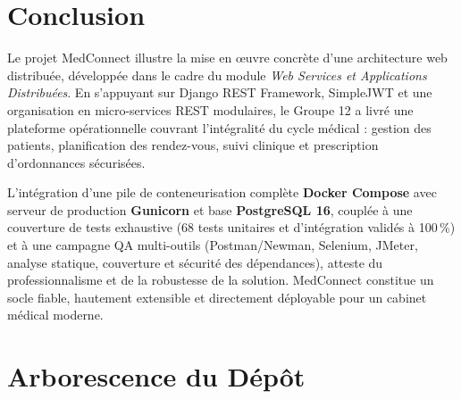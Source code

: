 \documentclass[12pt,a4paper]{report}
\begin{document}
\chapter*{Conclusion}

Le projet MedConnect illustre la mise en \oe{}uvre concrète d'une architecture web distribuée, développée dans le cadre du module \textit{Web Services et Applications Distribuées}. En s'appuyant sur Django REST Framework, SimpleJWT et une organisation en micro-services REST modulaires, le Groupe 12 a livré une plateforme opérationnelle couvrant l'intégralité du cycle médical : gestion des patients, planification des rendez-vous, suivi clinique et prescription d'ordonnances sécurisées.

L'intégration d'une pile de conteneurisation complète \textbf{Docker Compose} avec serveur de production \textbf{Gunicorn} et base \textbf{PostgreSQL 16}, couplée à une couverture de tests exhaustive (68 tests unitaires et d'intégration validés à 100\,\%) et à une campagne QA multi-outils (Postman/Newman, Selenium, JMeter, analyse statique, couverture et sécurité des dépendances), atteste du professionnalisme et de la robustesse de la solution. MedConnect constitue un socle fiable, hautement extensible et directement déployable pour un cabinet médical moderne.

\appendix

\chapter{Arborescence du Dépôt}
\end{document}
